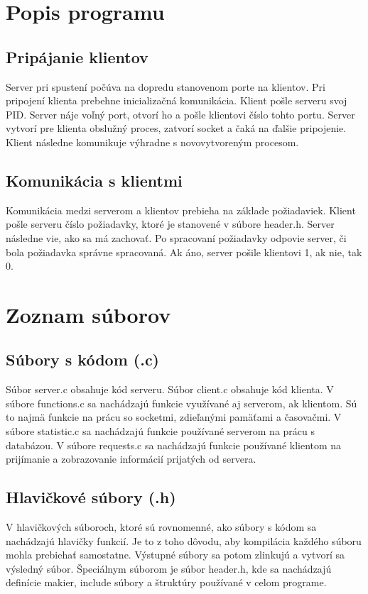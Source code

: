 \documentclass{article}
\begin{document}
\section{Popis programu}
\subsection{Pripájanie klientov}
Server pri spustení počúva na dopredu stanovenom porte na klientov. Pri pripojení klienta prebehne
inicializačná komunikácia. Klient pošle serveru svoj PID. Server náje voľný port, otvorí ho a
pošle klientovi číslo tohto portu. Server vytvorí pre klienta obslužný proces, zatvorí socket a čaká
na ďalšie pripojenie. Klient následne komunikuje výhradne s novovytvoreným procesom.

\subsection{Komunikácia s klientmi}
Komunikácia medzi serverom a klientov prebieha na základe požiadaviek. Klient pošle serveru číslo
požiadavky, ktoré je stanovené v súbore header.h. Server následne vie, ako sa má zachovať. Po
spracovaní požiadavky odpovie server, či bola požiadavka správne spracovaná. Ak áno, server pošile
klientovi 1, ak nie, tak 0.

\section{Zoznam súborov}
\subsection{Súbory s kódom (.c)}
Súbor server.c obsahuje kód serveru. Súbor client.c obsahuje kód klienta.
\newline
V súbore functions.c sa nachádzajú funkcie využívané aj serverom, ak klientom. Sú to najmä funkcie na
prácu so socketmi, zdieľanými pamäťami a časovačmi.
\newline
V súbore statistic.c sa nachádzajú funkcie používané serverom na prácu s databázou. 
\newline
V súbore requests.c sa nachádzajú funkcie používané klientom na prijímanie a zobrazovanie informácií prijatých od servera.
\subsection{Hlavičkové súbory (.h)}
V hlavičkových súboroch, ktoré sú rovnomenné, ako súbory s kódom sa nachádzajú hlavičky funkcií. Je
to z toho dôvodu, aby kompilácia každého súboru mohla prebiehať samostatne. Výstupné súbory sa
potom zlinkujú a vytvorí sa výsledný súbor. 
\newline
Špeciálnym súborom je súbor header.h, kde sa nachádzajú definície makier, include súbory a štruktúry
používané v celom programe.
\end{document}
